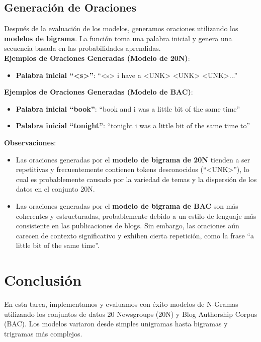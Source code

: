 \documentclass[11pt,english]{article}
\theoremstyle{plain}
\begin{document}
\subsection{Generación de Oraciones}

Después de la evaluación de los modelos, generamos oraciones utilizando los \textbf{modelos de bigrama}. La función toma una palabra inicial y genera una secuencia basada en las probabilidades aprendidas.\\

\textbf{Ejemplos de Oraciones Generadas (Modelo de 20N)}:
\begin{itemize}
    \item \textbf{Palabra inicial ``<s>''}: ``<s> i have a <UNK> <UNK> <UNK>...''
\end{itemize}

\textbf{Ejemplos de Oraciones Generadas (Modelo de BAC)}:
\begin{itemize}
    \item \textbf{Palabra inicial ``book''}: ``book and i was a little bit of the same time''
    \item \textbf{Palabra inicial ``tonight''}: ``tonight i was a little bit of the same time to''
\end{itemize}

\textbf{Observaciones}:
\begin{itemize}
    \item Las oraciones generadas por el \textbf{modelo de bigrama de 20N} tienden a ser repetitivas y frecuentemente contienen tokens desconocidos (``<UNK>''), lo cual es probablemente causado por la variedad de temas y la dispersión de los datos en el conjunto 20N.
    \item Las oraciones generadas por el \textbf{modelo de bigrama de BAC} son más coherentes y estructuradas, probablemente debido a un estilo de lenguaje más consistente en las publicaciones de blogs. Sin embargo, las oraciones aún carecen de contexto significativo y exhiben cierta repetición, como la frase ``a little bit of the same time''.
\end{itemize}

\section{Conclusión}

En esta tarea, implementamos y evaluamos con éxito modelos de N-Gramas utilizando los conjuntos de datos 20 Newsgroups (20N) y Blog Authorship Corpus (BAC). Los modelos variaron desde simples unigramas hasta bigramas y trigramas más complejos.\\
\end{document}
